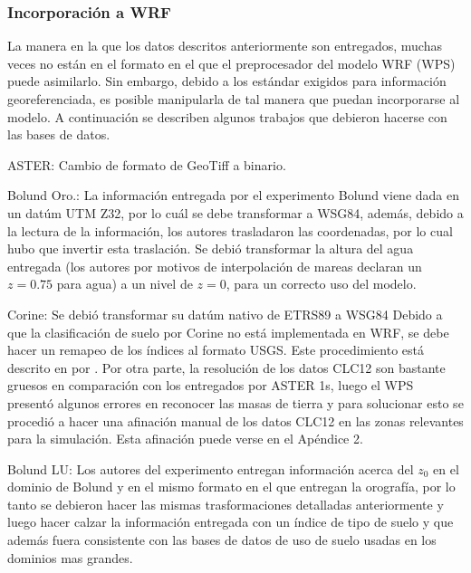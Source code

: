 \subsubsection{Incorporación a WRF}
La manera en la que los datos descritos anteriormente son entregados, muchas veces no están en el formato en el que el preprocesador del modelo WRF (WPS) puede asimilarlo. Sin embargo, debido a los estándar exigidos para información georeferenciada, es posible manipularla de tal manera que puedan incorporarse al modelo. A continuación se describen algunos trabajos que debieron hacerse con las bases de datos.
\begin{itemize*}
	\item ASTER: Cambio de formato de GeoTiff a binario.
	\item Bolund Oro.: La información entregada por el experimento Bolund viene dada en un datúm UTM Z32, por lo cuál se debe transformar a WSG84, además, debido a la lectura de la información, los autores trasladaron las coordenadas, por lo cual hubo que invertir esta traslación. Se debió transformar la altura del agua entregada (los autores por motivos de interpolación de mareas declaran un $z=0.75$ para agua) a un nivel de $z=0$, para un correcto uso del modelo. 
	\item Corine: Se debió transformar su datúm nativo de ETRS89 a WSG84 Debido a que la clasificación de suelo por Corine no está implementada en WRF, se debe hacer un remapeo de los índices al formato USGS. Este procedimiento está descrito en por \cite{Pineda2004}. Por otra parte, la resolución de los datos CLC12 son bastante gruesos en comparación con los entregados por ASTER 1s, luego el WPS presentó algunos errores en reconocer las masas de tierra y para solucionar esto se procedió a hacer una afinación manual de los datos CLC12 en las zonas relevantes para la simulación. Esta afinación puede verse en el Apéndice 2.
	\item Bolund LU: Los autores del experimento entregan información acerca del $z_0$ en el dominio de Bolund y en el mismo formato en el que entregan la orografía, por lo tanto se debieron hacer las mismas trasformaciones detalladas anteriormente y luego hacer calzar la información entregada con un índice de tipo de suelo y que además fuera consistente con las bases de datos de uso de suelo usadas en los dominios mas grandes.
\end{itemize*}
